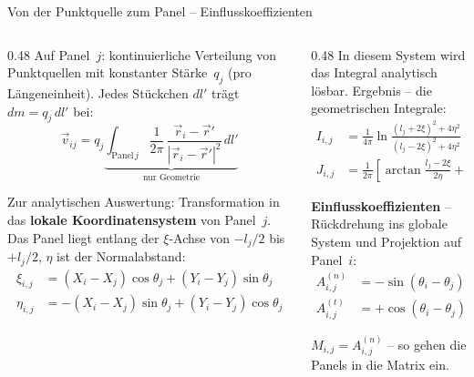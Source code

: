 \documentclass[aspectratio=169]{beamer}
\begin{document}
\begin{frame}{Von der Punktquelle zum Panel -- Einflusskoeffizienten}
\footnotesize

\begin{columns}[T]
\begin{column}{0.48\textwidth}
Auf Panel~$j$: kontinuierliche Verteilung von
Punktquellen mit konstanter Stärke~$q_j$ (pro Längeneinheit).
Jedes Stückchen $dl'$ trägt $dm\!=\!q_j\,dl'$ bei:
\vspace{-1mm}
\[
  \vec{v}_{ij} = q_j
  \underbrace{\int_{\text{Panel}\,j}
  \frac{1}{2\pi}\,
  \frac{\vec{r}_i - \vec{r}'}{|\vec{r}_i - \vec{r}'|^2}\,dl'}_{\text{nur Geometrie}}
\]

\vspace{-3mm}
Zur analytischen Auswertung: Transformation in das
\textbf{lokale Koordinatensystem} von Panel~$j$.
Das Panel liegt entlang der $\xi$-Achse von $-l_j/2$
bis $+l_j/2$, $\eta$ ist der Normalabstand:
\vspace{-1mm}
\begin{align*}
  \xi_{i,j} &= (X_i\!-\!X_j)\cos\theta_j + (Y_i\!-\!Y_j)\sin\theta_j \\[-1pt]
  \eta_{i,j} &= -(X_i\!-\!X_j)\sin\theta_j + (Y_i\!-\!Y_j)\cos\theta_j
\end{align*}
\end{column}
\begin{column}{0.48\textwidth}
In diesem System wird das Integral analytisch lösbar.
Ergebnis -- die geometrischen Integrale:
\vspace{-1mm}
\begin{align*}
  I_{i,j} &= \frac{1}{4\pi}\ln\frac{(l_j+2\xi)^2+4\eta^2}
                                     {(l_j-2\xi)^2+4\eta^2} \\[2pt]
  J_{i,j} &= \frac{1}{2\pi}\!\left[
    \arctan\frac{l_j-2\xi}{2\eta}
    + \arctan\frac{l_j+2\xi}{2\eta}\right]
\end{align*}

\vspace{-3mm}
\textbf{Einflusskoeffizienten} -- Rückdrehung ins globale
System und Projektion auf Panel~$i$:
\vspace{-1mm}
\begin{align*}
  A^{(n)}_{i,j} &= -\sin(\theta_i\!-\!\theta_j)\,I_{i,j}
                   +\cos(\theta_i\!-\!\theta_j)\,J_{i,j} \\[2pt]
  A^{(t)}_{i,j} &= +\cos(\theta_i\!-\!\theta_j)\,I_{i,j}
                   +\sin(\theta_i\!-\!\theta_j)\,J_{i,j}
\end{align*}

\vspace{-4mm}
$M_{i,j} = A^{(n)}_{i,j}$ -- so gehen die Panels in die Matrix ein.
\end{column}
\end{columns}

\end{frame}
\end{document}
